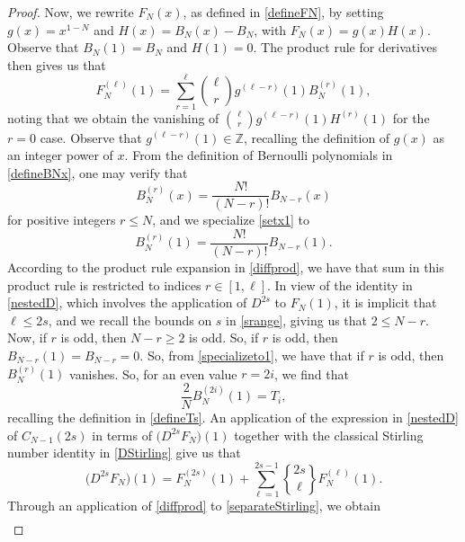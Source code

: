 \documentclass[10pt,a4paper]{amsart}
\DeclareRobustCommand{\stirling}{\genfrac\{\}{0pt}{}}
\begin{document}
\begin{proof}
 Now, we rewrite $F_{N}(x)$, as defined in \eqref{defineFN}, by setting $g(x) = x^{1-N}$ and $H(x) = B_{N}(x) - B_{N}$, with $F_{N}(x) 
 = g(x) H(x)$. Observe that $B_{N}(1) = B_{N}$ and $H(1) = 0$.
 The product rule for derivatives then gives us that 
\begin{equation}\label{diffprod} 
 F_{N}^{(\ell)}(1) = \sum_{r=1}^{\ell} \binom{\ell}{r} g^{(\ell - r)}(1) B_{N}^{(r)}(1),
\end{equation}
 noting that we obtain the vanishing of $\binom{\ell}{r} g^{(\ell - r)}(1) H^{(r)}(1) $
 for the $r = 0$ case. 
 Observe that $g^{(\ell - r)}(1) \in \mathbb{Z}$, recalling the definition of $g(x)$ as an integer power of $x$. 
 From the definition of Bernoulli polynomials in \eqref{defineBNx}, one may verify that 
\begin{equation}\label{setx1} 
 B_{N}^{(r)}(x) = \frac{N!}{(N-r)!} B_{N - r}(x) 
\end{equation}
 for positive integers $r \leq N$, and we specialize \eqref{setx1} to 
\begin{equation}\label{specializeto1}
 B_{N}^{(r)}(1) = \frac{N!}{(N-r)!} B_{N - r}(1). 
\end{equation}
 According to the product rule expansion in \eqref{diffprod}, we have that sum in this product rule is restricted to indices $r \in [1, 
 \ell]$. In view of the identity in \eqref{nestedD}, which involves the application of $D^{2s}$ to $F_{N}(1)$, it is implicit that $\ell \leq 2 
 s$, and we recall the bounds on $s$ in \eqref{srange}, giving us that $2 \leq N - r$. Now, if $r$ is odd, then $N - r \geq 2$ is odd. 
 So, if $r$ is odd, then $B_{N-r}(1) = B_{N-r} = 0$. So, from \eqref{specializeto1}, we have that if $r$ is odd, 
 then $B_{N}^{(r)}(1)$ vanishes. 
 So, for an even value $r = 2i$, 
 we find that 
\begin{equation}\label{BntoT} 
 \frac{2}{N} B_{N}^{(2i)}(1) = T_{i}, 
\end{equation}
 recalling the definition in \eqref{defineTs}. An application of 
 the expression in \eqref{nestedD} of $C_{N-1}(2s)$ in terms of $\big( D^{2s}F_{N} \big)(1)$ 
 together with 
 the classical Stirling number identity in \eqref{DStirling}
 give  us that 
\begin{equation}\label{separateStirling} 
 \big( D^{2s} F_{N} \big)(1) = F_{N}^{(2s)}(1)
 + \sum_{\ell = 1}^{2s-1} \stirling{2s}{\ell} F_{N}^{(\ell)}(1). 
\end{equation}
 Through an application of \eqref{diffprod} to \eqref{separateStirling}, we obtain 
\begin{multline*}

\end{multline*}
\end{proof}
\end{document}
